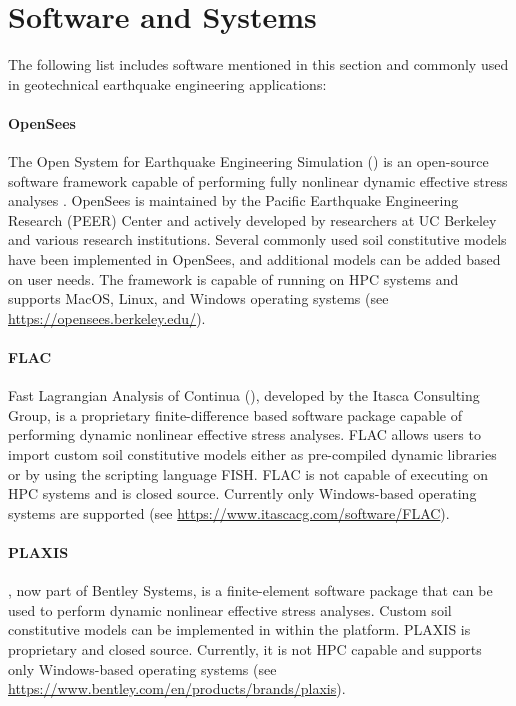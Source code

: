 \section{Software and Systems}
\label{sec:response_geotech_tools}

The following list includes software mentioned in this section and commonly used in geotechnical earthquake engineering applications:

\paragraph{OpenSees}
The Open System for Earthquake Engineering Simulation () is an open-source software framework capable of performing fully nonlinear dynamic effective stress analyses \citep{mckenna2011opensees}. OpenSees is maintained by the Pacific Earthquake Engineering Research (PEER) Center and actively developed by researchers at UC Berkeley and various research institutions. Several commonly used soil constitutive models have been implemented in OpenSees, and additional models can be added based on user needs. The framework is capable of running on HPC systems and supports MacOS, Linux, and Windows operating systems (see \url{https://opensees.berkeley.edu/}).

\paragraph{FLAC}
Fast Lagrangian Analysis of Continua (), developed by the Itasca Consulting Group, is a proprietary finite-difference based software package capable of performing dynamic nonlinear effective stress analyses. FLAC allows users to import custom soil constitutive models either as pre-compiled dynamic libraries or by using the scripting language FISH. FLAC is not capable of executing on HPC systems and is closed source. Currently only Windows-based operating systems are supported (see \url{https://www.itascacg.com/software/FLAC}).

\paragraph{PLAXIS}
, now part of Bentley Systems, is a finite-element software package that can be used to perform dynamic nonlinear effective stress analyses. Custom soil constitutive models can be implemented in within the platform. PLAXIS is proprietary and closed source. Currently, it is not HPC capable and supports only Windows-based operating systems (see \url{https://www.bentley.com/en/products/brands/plaxis}).

